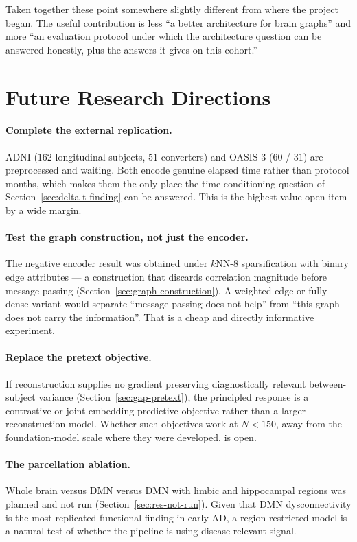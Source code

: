 Taken together these point somewhere slightly different from where the project began. The
useful contribution is less ``a better architecture for brain graphs'' and more ``an
evaluation protocol under which the architecture question can be answered honestly, plus the
answers it gives on this cohort.''

\section{Future Research Directions}
\label{sec:future}

\paragraph{Complete the external replication.} ADNI ($162$ longitudinal subjects, $51$
converters) and OASIS-3 ($60$ / $31$) are preprocessed and waiting. Both encode genuine
elapsed time rather than protocol months, which makes them the only place the
time-conditioning question of Section~\ref{sec:delta-t-finding} can be answered. This is the
highest-value open item by a wide margin.

\paragraph{Test the graph construction, not just the encoder.} The negative encoder result
was obtained under $k$NN-8 sparsification with binary edge attributes --- a construction that
discards correlation magnitude before message passing
(Section~\ref{sec:graph-construction}). A weighted-edge or fully-dense variant would
separate ``message passing does not help'' from ``this graph does not carry the
information''. That is a cheap and directly informative experiment.

\paragraph{Replace the pretext objective.} If reconstruction supplies no gradient preserving
diagnostically relevant between-subject variance (Section~\ref{sec:gap-pretext}), the
principled response is a contrastive or joint-embedding predictive objective rather than a
larger reconstruction model. Whether such objectives work at $N < 150$, away from the
foundation-model scale where they were developed, is open.

\paragraph{The parcellation ablation.} Whole brain versus DMN versus DMN with limbic and
hippocampal regions was planned and not run (Section~\ref{sec:res-not-run}). Given that DMN
dysconnectivity is the most replicated functional finding in early AD, a region-restricted
model is a natural test of whether the pipeline is using disease-relevant signal.

